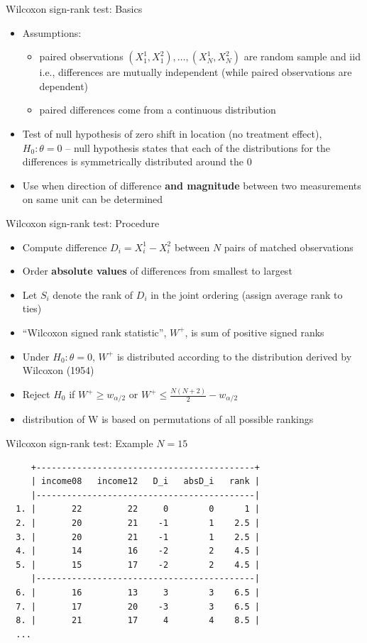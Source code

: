 \documentclass[xcolor=table,dvipsnames]{beamer}
\begin{document}
\begin{frame}{Wilcoxon sign-rank test: Basics}
\begin{itemize}
\item Assumptions: \pause 
	\begin{itemize}
	\item paired observations $(X_1^1,X_1^2),\ldots,(X_N^1,X_N^2)$ are random sample and iid \pause i.e., differences are mutually independent (while paired observations are dependent)\pause
	\item paired differences come from a continuous distribution \pause
	\end{itemize}
\item Test of null hypothesis of zero shift in location (no treatment effect), $H_0:\theta=0$ -- null hypothesis states that each of the distributions for the differences is symmetrically distributed around the 0 \pause
\item Use when direction of difference \textbf{and magnitude} between two measurements on same unit can be determined
\end{itemize}

\end{frame}


\begin{frame}{Wilcoxon sign-rank test: Procedure}
\begin{itemize}
\item Compute difference $D_i = X_i^1 - X_i^2$ between $N$ pairs of matched observations	
\item Order \textbf{absolute values} of differences from smallest to largest \pause
\item Let $S_i$ denote the rank of $D_i$ in the joint ordering (assign average rank to ties) \pause
\item ``Wilcoxon signed rank statistic'', $W^+$, is sum of positive signed ranks 
\item Under $H_0: \theta =0$, $W^+$ is distributed according to the distribution derived by Wilcoxon (1954)
\item Reject $H_0$ if $W^+\geq w_{\alpha/2}$ or $W^+\leq\frac{N(N+2)}{2}-w_{\alpha/2}$
\item distribution of W is based on permutations of all possible rankings
\end{itemize}
\end{frame}

\begin{frame}[fragile]{Wilcoxon sign-rank test: Example}
$N=15$
\begin{verbatim}
     +-------------------------------------------+
     | income08   income12   D_i   absD_i   rank |
     |-------------------------------------------|
  1. |       22         22     0        0      1 |
  2. |       20         21    -1        1    2.5 |
  3. |       20         21    -1        1    2.5 |
  4. |       14         16    -2        2    4.5 |
  5. |       15         17    -2        2    4.5 |
     |-------------------------------------------|
  6. |       16         13     3        3    6.5 |
  7. |       17         20    -3        3    6.5 |
  8. |       21         17     4        4    8.5 |
  ...
\end{verbatim}
\end{frame}
\end{document}
